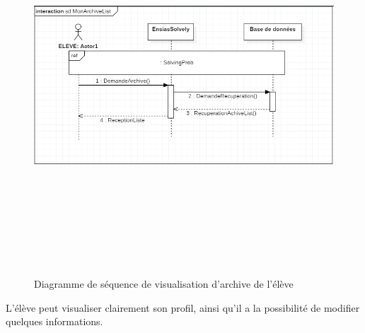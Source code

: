 \documentclass[11.5pt]{report}
\begin{document}
\begin{figure}[h]
	
	\begin{center}
		\includegraphics[width=400pt,height=400pt]{seq4.png} 
		\caption{Diagramme de séquence de visualisation d'archive de l'élève}
	\end{center}
	
\end{figure}
\newpage
L’élève peut visualiser clairement son profil, ainsi qu’il a la possibilité de modifier quelques informations.\\
\end{document}
